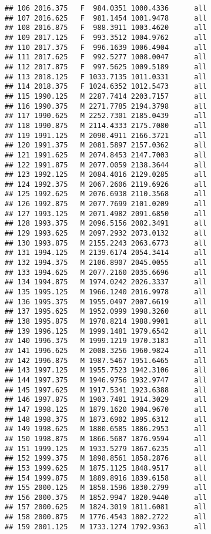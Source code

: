 \documentclass[]{article}
\begin{document}
\begin{verbatim}
## 106 2016.375   F  984.0351 1000.4336      all
## 107 2016.625   F  981.1454 1001.9478      all
## 108 2016.875   F  988.3911 1003.4620      all
## 109 2017.125   F  993.3512 1004.9762      all
## 110 2017.375   F  996.1639 1006.4904      all
## 111 2017.625   F  992.5277 1008.0047      all
## 112 2017.875   F  997.5625 1009.5189      all
## 113 2018.125   F 1033.7135 1011.0331      all
## 114 2018.375   F 1024.6352 1012.5473      all
## 115 1990.125   M 2287.7414 2203.7157      all
## 116 1990.375   M 2271.7785 2194.3798      all
## 117 1990.625   M 2252.7301 2185.0439      all
## 118 1990.875   M 2114.4333 2175.7080      all
## 119 1991.125   M 2090.4911 2166.3721      all
## 120 1991.375   M 2081.5897 2157.0362      all
## 121 1991.625   M 2074.8453 2147.7003      all
## 122 1991.875   M 2077.0059 2138.3644      all
## 123 1992.125   M 2084.4016 2129.0285      all
## 124 1992.375   M 2067.2606 2119.6926      all
## 125 1992.625   M 2076.6938 2110.3568      all
## 126 1992.875   M 2077.7699 2101.0209      all
## 127 1993.125   M 2071.4982 2091.6850      all
## 128 1993.375   M 2096.5156 2082.3491      all
## 129 1993.625   M 2097.2932 2073.0132      all
## 130 1993.875   M 2155.2243 2063.6773      all
## 131 1994.125   M 2139.6174 2054.3414      all
## 132 1994.375   M 2106.8907 2045.0055      all
## 133 1994.625   M 2077.2160 2035.6696      all
## 134 1994.875   M 1974.0242 2026.3337      all
## 135 1995.125   M 1966.1240 2016.9978      all
## 136 1995.375   M 1955.0497 2007.6619      all
## 137 1995.625   M 1952.0999 1998.3260      all
## 138 1995.875   M 1978.8214 1988.9901      all
## 139 1996.125   M 1999.1481 1979.6542      all
## 140 1996.375   M 1999.1219 1970.3183      all
## 141 1996.625   M 2008.3256 1960.9824      all
## 142 1996.875   M 1987.5467 1951.6465      all
## 143 1997.125   M 1955.7523 1942.3106      all
## 144 1997.375   M 1946.9756 1932.9747      all
## 145 1997.625   M 1917.5341 1923.6388      all
## 146 1997.875   M 1903.7481 1914.3029      all
## 147 1998.125   M 1879.1620 1904.9670      all
## 148 1998.375   M 1873.6902 1895.6312      all
## 149 1998.625   M 1880.6585 1886.2953      all
## 150 1998.875   M 1866.5687 1876.9594      all
## 151 1999.125   M 1933.5279 1867.6235      all
## 152 1999.375   M 1898.8561 1858.2876      all
## 153 1999.625   M 1875.1125 1848.9517      all
## 154 1999.875   M 1889.8916 1839.6158      all
## 155 2000.125   M 1858.1596 1830.2799      all
## 156 2000.375   M 1852.9947 1820.9440      all
## 157 2000.625   M 1824.3019 1811.6081      all
## 158 2000.875   M 1776.4543 1802.2722      all
## 159 2001.125   M 1733.1274 1792.9363      all

\end{verbatim}
\end{document}
